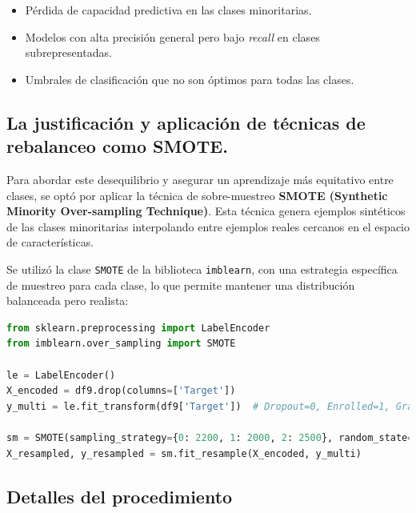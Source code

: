 \documentclass{report}[14pt]
\begin{document}
\begin{itemize}
    \item Pérdida de capacidad predictiva en las clases minoritarias.
    \item Modelos con alta precisión general pero bajo \textit{recall} en clases subrepresentadas.
    \item Umbrales de clasificación que no son óptimos para todas las clases.
\end{itemize}
\subsection{La justificación y aplicación de técnicas de rebalanceo como SMOTE.}
Para abordar este desequilibrio y asegurar un aprendizaje más equitativo entre clases, se optó por aplicar la técnica de sobre-muestreo \textbf{SMOTE (Synthetic Minority Over-sampling Technique)}. Esta técnica genera ejemplos sintéticos de las clases minoritarias interpolando entre ejemplos reales cercanos en el espacio de características.

Se utilizó la clase \texttt{SMOTE} de la biblioteca \texttt{imblearn}, con una estrategia específica de muestreo para cada clase, lo que permite mantener una distribución balanceada pero realista:

\begin{lstlisting}[language=Python]
from sklearn.preprocessing import LabelEncoder
from imblearn.over_sampling import SMOTE

le = LabelEncoder()
X_encoded = df9.drop(columns=['Target'])
y_multi = le.fit_transform(df9['Target'])  # Dropout=0, Enrolled=1, Graduate=2 

sm = SMOTE(sampling_strategy={0: 2200, 1: 2000, 2: 2500}, random_state=42)
X_resampled, y_resampled = sm.fit_resample(X_encoded, y_multi)
\end{lstlisting}

\subsection{Detalles del procedimiento}
\end{document}
